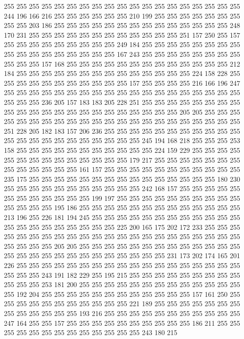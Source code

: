 255 255 255 255 255 255 255 255 255 255 255 255 255 255 255 255 255 255 255 244
196 166 216 255 255 255 255 255 255 210 199 255 255 255 255 255 255 255 255 255
203 186 255 255 255 255 255 255 255 255 255 255 255 255 255 255 248 170 231 255
255 255 255 255 255 255 255 255 255 255 255 251 157 250 255 157 255 255 255 255
255 255 255 255 255 249 184 255 255 255 255 255 255 255 255 255 255 255 255 255
255 255 255 255 167 243 255 255 255 255 255 255 255 255 255 255 255 157 168 255
255 255 255 255 255 255 255 255 255 255 255 255 212 184 255 255 255 255 255 255
255 255 255 255 255 255 255 255 224 158 228 255 255 255 255 255 255 255 255 255
255 255 157 255 255 255 255 216 166 196 247 255 255 255 255 255 255 255 255 255
255 255 255 255 255 255 255 255 255 255 255 255 255 236 205 157 183 183 205 228
251 255 255 255 255 255 255 255 255 255 255 255 255 255 255 255 255 255 255 255
255 255 255 205 205 255 255 255 255 255 255 255 255 255 255 255 255 255 255 255
255 255 255 255 255 255 255 251 228 205 182 183 157 206 236 255 255 255 255 255
255 255 255 255 255 255 255 255 255 255 255 255 255 255 255 255 255 245 194 168
218 255 255 255 253 158 255 255 255 255 255 255 255 255 255 255 255 224 159 229
255 255 255 255 255 255 255 255 255 255 255 255 255 255 179 217 255 255 255 255
255 255 255 255 255 255 255 255 255 161 157 255 255 255 255 255 255 255 255 255
255 255 235 175 255 255 255 255 255 255 255 255 255 255 255 255 255 255 255 180
230 255 255 255 255 255 255 255 255 255 255 255 242 168 157 255 255 255 255 255
255 255 255 255 255 255 255 199 197 255 255 255 255 255 255 255 255 255 255 255
255 255 255 195 186 255 255 255 255 255 255 255 255 255 255 255 255 255 213 196
255 226 181 194 245 255 255 255 255 255 255 255 255 255 255 255 255 255 255 255
255 255 255 255 255 255 225 200 165 175 202 172 233 255 255 255 255 255 255 255
255 255 255 255 255 255 255 255 255 255 255 255 255 255 255 255 255 255 255 205
205 255 255 255 255 255 255 255 255 255 255 255 255 255 255 255 255 255 255 255
255 255 255 255 255 255 255 231 173 202 174 165 201 226 255 255 255 255 255 255
255 255 255 255 255 255 255 255 255 255 255 255 255 255 255 243 191 182 229 255
195 215 255 255 255 255 255 255 255 255 255 255 255 255 253 181 200 255 255 255
255 255 255 255 255 255 255 255 255 255 255 192 204 255 255 255 255 255 255 255
255 255 255 255 255 157 161 250 255 255 255 255 255 255 255 255 255 255 255 221
189 255 255 255 255 255 255 255 255 255 255 255 255 255 193 216 255 255 255 255
255 255 255 255 255 255 255 247 164 255 255 157 255 255 255 255 255 255 255 255
255 255 186 211 255 255 255 255 255 255 255 255 255 255 255 255 255 243 180 215
